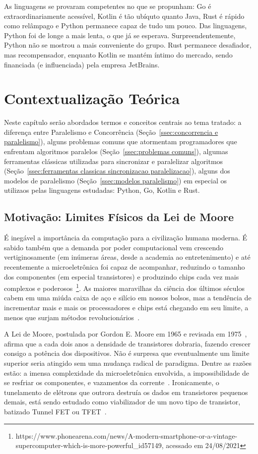 \documentclass{article}
\begin{document}
As linguagens se provaram competentes no que se propunham: Go é extraordinariamente acessível, Kotlin é tão ubíquto quanto Java, Rust é rápido como relâmpago e Python permanece capaz de tudo um pouco. Das linguagens, Python foi de longe a mais lenta, o que já se esperava. Surpreendentemente, Python não se mostrou a mais conveniente do grupo. Rust permanece desafiador, mas recompensador, enquanto Kotlin se mantém íntimo do mercado, sendo financiada (e influenciada) pela empresa JetBrains.

\section{Contextualização Teórica}

Neste capítulo serão abordados termos e conceitos centrais ao tema tratado: a diferença entre Paralelismo e Concorrência (Seção~\ref{ssec:concorrencia e paralelismo}), alguns problemas comuns que atormentam programadores que enfrentam algoritmos paralelos (Seção~\ref{ssec:problemas comuns}), algumas ferramentas clássicas utilizadas para sincronizar e paralelizar algoritmos (Seção~\ref{ssec:ferramentas classicas sincronizacao paralelizacao}), alguns dos modelos de paralelismo (Seção~\ref{ssec:modelos paralelismo}) em especial os utilizaos pelas linguagens estudadas: Python, Go, Kotlin e Rust.

\subsection{Motivação: Limites Físicos da Lei de Moore}

É inegável a importância da computação para a civilização humana moderna. É sabido também que a demanda por poder computacional vem crescendo vertiginosamente (em inúmeras áreas, desde a academia ao entretenimento) e até recentemente a microeletrônica foi capaz de acompanhar, reduzindo o tamanho dos componentes (em especial transistores) e produzindo chips cada vez mais complexos e poderosos~\footnote{https://www.phonearena.com/news/A-modern-smartphone-or-a-vintage-supercomputer-which-is-more-powerful\_id57149, acessado em 24/08/2021}. As maiores maravilhas da ciência dos últimos séculos cabem em uma miúda caixa de aço e silício em nossos bolsos, mas a tendência de incrementar mais e mais os processadores e chips está chegando em seu limite, a menos que surjam métodos revolucionários~\cite{powell2008quantum}.

A Lei de Moore, postulada por Gordon E. Moore em 1965 e revisada em 1975~\cite{moore1965cramming}, afirma que a cada dois anos a densidade de transistores dobraria, fazendo crescer consigo a potência dos dispositivos. Não é surpresa que eventualmente um limite superior seria atingido sem uma mudança radical de paradigma. Dentre as razões estão: a imensa complexidade da microeletrônica envolvida, a impossibilidade de se resfriar os componentes, e vazamentos da corrente~\cite{seabaugh2013tunneling}. Ironicamente, o tunelamento de elétrons que outrora destruía os dados em transistores pequenos demais, está sendo estudado como viabilizador de um novo tipo de transistor, batizado Tunnel FET ou TFET~\cite{seabaugh2013tunneling}.
\end{document}
